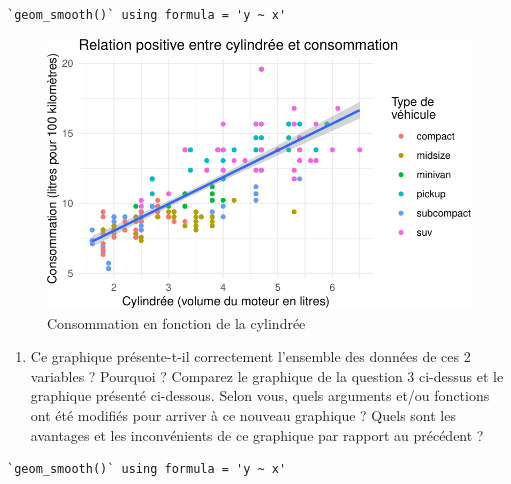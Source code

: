 \documentclass[
  a4paper,
  DIV=11,
  numbers=noendperiod,
  oneside]{scrreprt}
\providecommand{\tightlist}{%
  \setlength{\itemsep}{0pt}\setlength{\parskip}{0pt}}\usepackage{longtable,booktabs,array}
\begin{document}
\begin{verbatim}
`geom_smooth()` using formula = 'y ~ x'
\end{verbatim}

\begin{figure}[H]

{\centering \includegraphics{04-DataWrangling_files/figure-pdf/consommation-1.pdf}

}

\caption{Consommation en fonction de la cylindrée}

\end{figure}%

\begin{enumerate}
\def\labelenumi{\arabic{enumi}.}
\setcounter{enumi}{3}
\tightlist
\item
  Ce graphique présente-t-il correctement l'ensemble des données de ces
  2 variables ? Pourquoi ? Comparez le graphique de la question 3
  ci-dessus et le graphique présenté ci-dessous. Selon vous, quels
  arguments et/ou fonctions ont été modifiés pour arriver à ce nouveau
  graphique ? Quels sont les avantages et les inconvénients de ce
  graphique par rapport au précédent ?
\end{enumerate}

\begin{verbatim}
`geom_smooth()` using formula = 'y ~ x'
\end{verbatim}
\end{document}
